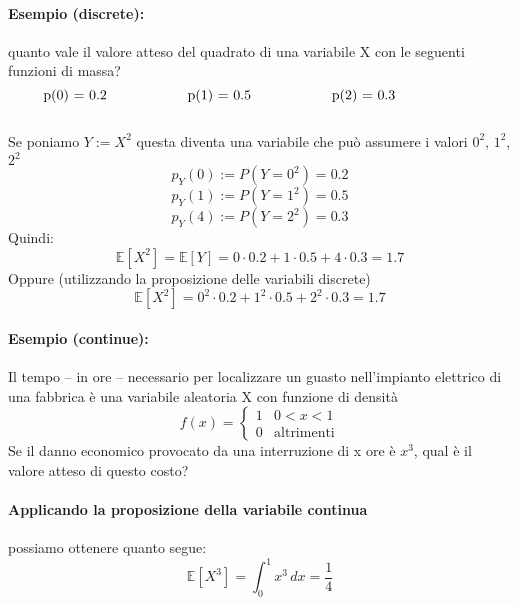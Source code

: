 \documentclass[]{article}
\newcommand{\ev}{\mathbb{E}[X]}
\renewcommand{\ev}[1]{\mathbb{E}[#1]}
\begin{document}
    \paragraph{Esempio (discrete):} quanto vale il valore atteso del quadrato di una variabile X con le seguenti funzioni di massa?
    \begin{equation*}
        \begin{minipage}{0.3\textwidth}
            p(0) = 0.2
        \end{minipage}
        \begin{minipage}{0.3\textwidth}
            p(1) = 0.5
        \end{minipage}
        \begin{minipage}{0.3\textwidth}
            p(2) = 0.3
        \end{minipage}
    \end{equation*} \\
    Se poniamo $Y := X^2$ questa diventa una variabile che può assumere i valori $0^2$, $1^2$, $2^2$
    \[ p_Y(0) := P(Y = 0^2) = 0.2 \]
    \[ p_Y(1) := P(Y = 1^2) = 0.5 \]
    \[ p_Y(4) := P(Y = 2^2) = 0.3 \]
    Quindi:
    \[ \ev{X^2} = \ev{Y} = 0 \cdot 0.2 + 1 \cdot 0.5 + 4 \cdot 0.3 = 1.7 \]
    Oppure (utilizzando la proposizione delle variabili discrete)
    \[ \ev{X^2} = 0^2 \cdot 0.2 + 1^2 \cdot 0.5 + 2^2 \cdot 0.3 = 1.7\]

    \paragraph{Esempio (continue):} Il tempo – in ore – necessario per localizzare un guasto nell’impianto
    elettrico di una fabbrica è una variabile aleatoria X con funzione di densità
    \begin{equation*}
        f(x) =
        \begin{cases}
            1 & 0 < x < 1 \\
            0 & \text{altrimenti}
        \end{cases}
    \end{equation*}
    Se il danno economico provocato da una interruzione di x ore è $x^3$, qual è il valore
    atteso di questo costo? \\
    \paragraph{Applicando la proposizione della variabile continua} possiamo ottenere quanto segue:
    \[ \ev{X^3} = \int_{0}^{1} x^3 \, dx = \frac{1}{4} \]
\end{document}
